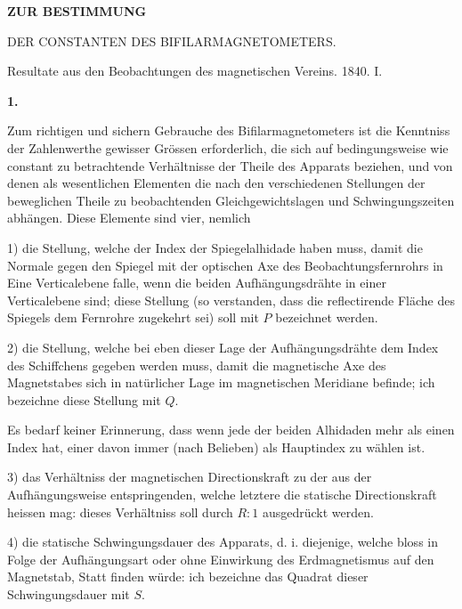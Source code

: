 \clearpage
{}
\begin{center}
{\Large\bfseries ZUR BESTIMMUNG\par\medskip DER CONSTANTEN DES BIFILARMAGNETOMETERS.}
\par\bigskip
Resultate aus den Beobachtungen des magnetischen Vereins. 1840. I.
\end{center}
\renewcommand{\Article}[1]{\par\medskip\Needspace{4\baselineskip}\pdfbookmark[1]{#1.}{bifilarconstanten-art-#1}\centerline{\textbf{#1.}}\nobreak\smallskip}%
\Article{1}
Zum richtigen und sichern Gebrauche des Bifilarmagnetometers ist die Kenntniss der Zahlenwerthe gewisser Grössen erforderlich, die sich auf bedingungsweise wie constant zu betrachtende Verhältnisse der Theile des Apparats beziehen, und von denen als wesentlichen Elementen die nach den verschiedenen Stellungen der beweglichen Theile zu beobachtenden Gleichgewichtslagen und Schwingungszeiten abhängen. Diese Elemente sind vier, nemlich

1) die Stellung, welche der Index der Spiegelalhidade haben muss, damit die Normale gegen den Spiegel mit der optischen Axe des Beobachtungsfernrohrs in Eine Verticalebene falle, wenn die beiden Aufhängungsdrähte in einer Verticalebene sind; diese Stellung (so verstanden, dass die reflectirende Fläche des Spiegels dem Fernrohre zugekehrt sei) soll mit $P$ bezeichnet werden.

2) die Stellung, welche bei eben dieser Lage der Aufhängungsdrähte dem Index des Schiffchens gegeben werden muss, damit die magnetische Axe des Magnetstabes sich in natürlicher Lage im magnetischen Meridiane befinde; ich bezeichne diese Stellung mit $Q$.

Es bedarf keiner Erinnerung, dass wenn jede der beiden Alhidaden mehr als einen Index hat, einer davon immer (nach Belieben) als Hauptindex zu wählen ist.

3) das Verhältniss der magnetischen Directionskraft zu der aus der Aufhängungsweise entspringenden, welche letztere die statische Directionskraft heissen mag: dieses Verhältniss soll durch $R:1$ ausgedrückt werden.

4) die statische Schwingungsdauer des Apparats, d. i. diejenige, welche bloss in Folge der Aufhängungsart oder ohne Einwirkung des Erdmagnetismus auf den Magnetstab, Statt finden würde: ich bezeichne das Quadrat dieser Schwingungsdauer mit $S$.

